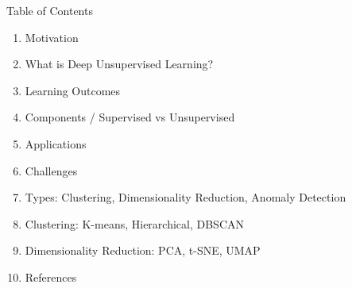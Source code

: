\begin{frame}[allowframebreaks]{Table of Contents}
\begin{enumerate}
    \setlength{\itemsep}{-0.2em}
    \item Motivation
    \item What is Deep Unsupervised Learning?
    \item Learning Outcomes
    \item Components / Supervised vs Unsupervised
    \item Applications
    \item Challenges
    \item Types: Clustering, Dimensionality Reduction, Anomaly Detection
    \item Clustering: K-means, Hierarchical, DBSCAN
    \item Dimensionality Reduction: PCA, t-SNE, UMAP
    \item References
\end{enumerate}
\end{frame}

